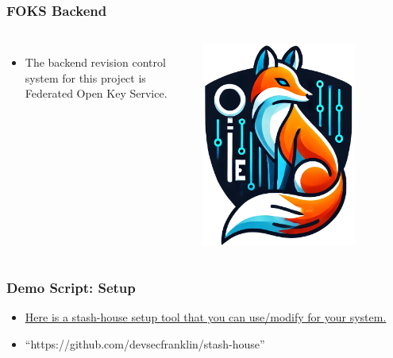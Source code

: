 \documentclass[aspectratio=169]{beamer}
\begin{document}
\begin{frame}
    \frametitle{FOKS Backend}
    \begin{columns}
    \begin{itemize}
        \item The backend revision control system for this project is Federated Open Key Service.
    \end{itemize}
        \includegraphics[width=0.75\textwidth]{../static/images/foks.png}
    \end{columns}
\end{frame}

\begin{frame}
    \frametitle{Demo Script: Setup}
    \begin{itemize}
        \item \href{ https://github.com/devsecfranklin/stash-house/blob/main/bin/install-client.sh }{Here is a stash-house setup tool that you can use/modify for your system. }    

        \item ``https://github.com/devsecfranklin/stash-house''
    \end{itemize}
\end{frame}
\end{document}
